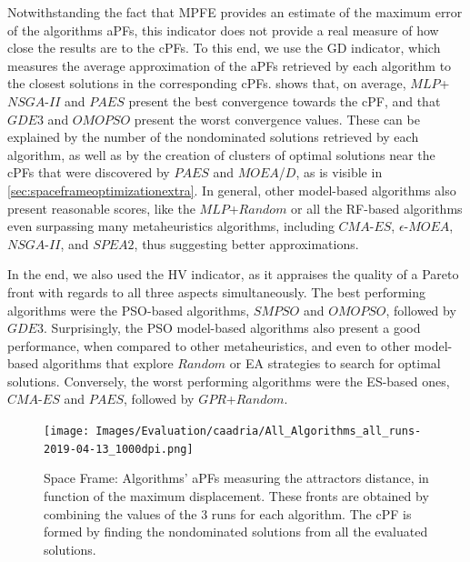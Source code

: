 Notwithstanding the fact that \ac{MPFE} provides an estimate of the maximum error of the algorithms \acp{aPF}, this indicator does not provide a real measure of how close the results are to the \acp{cPF}. To this end, we use the \ac{GD} indicator, which measures the average approximation of the \acp{aPF} retrieved by each algorithm to the closest solutions in the corresponding \acp{cPF}.  shows that, on average, $MLP$+$NSGA$-$II$ and $PAES$ present the best convergence towards the \ac{cPF}, and that $GDE3$ and $OMOPSO$ present the worst convergence values. These can be explained by the number of the nondominated solutions retrieved by each algorithm, as well as by the creation of clusters of optimal solutions near the \acp{cPF} that were discovered by $PAES$ and $MOEA$/$D$, as is visible in \cref{sec:spaceframeoptimizationextra}. In general, other model-based algorithms also present reasonable scores, like the $MLP$+$Random$ or all the \ac{RF}-based algorithms even surpassing many metaheuristics algorithms, including $CMA$-$ES$, $\epsilon$-$MOEA$, $NSGA$-$II$, and $SPEA2$, thus suggesting better approximations.

In the end, we also used the \ac{HV} indicator, as it appraises the quality of a Pareto front with regards to all three aspects simultaneously. The best performing algorithms were the \ac{PSO}-based algorithms, $SMPSO$ and $OMOPSO$, followed by $GDE3$. Surprisingly, the \ac{PSO} model-based algorithms also present a good performance, when compared to other metaheuristics, and even to other model-based algorithms that explore $Random$ or \ac{EA} strategies to search for optimal solutions. Conversely, the worst performing algorithms were the \ac{ES}-based ones, $CMA$-$ES$ and $PAES$, followed by $GPR$+$Random$. %
\begin{figure}[hptb]
	\centering
	\texttt{[image: Images/Evaluation/caadria/All\_Algorithms\_all\_runs-2019-04-13\_1000dpi.png]}
	\caption[Space Frame: Pareto front plot]{Space Frame: Algorithms' \acp{aPF} measuring the attractors distance, in function of the maximum displacement. These fronts are obtained by combining the values of the $3$ runs for each algorithm. The \ac{cPF} is formed by finding the nondominated solutions from all the evaluated solutions.}
	\label{fig:allruns}
\end{figure}

